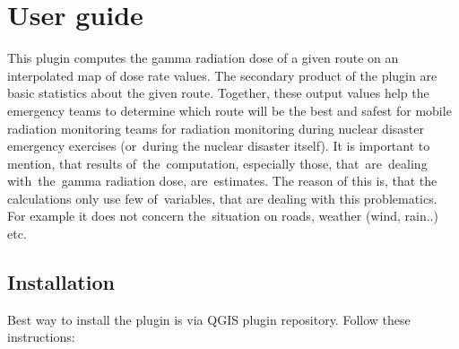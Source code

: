 \chapter{User guide} \label{User guide}

This plugin computes the gamma radiation dose of a given route on an
interpolated map of dose rate values. The secondary product of the
plugin are basic statistics about the given route. Together, these
output values help the emergency teams to determine which route will be
the best and safest for mobile radiation monitoring teams for radiation
monitoring during nuclear disaster emergency exercises (or~during the
nuclear disaster itself). It is important to mention, that results of~the~computation, especially
those, that~are~dealing with~the~gamma radiation dose, are~estimates.
The reason of this is, that the calculations only use few of~variables,
that are dealing with this problematics. For example it does not concern
the~situation on roads, weather (wind, rain..) etc.

\section{Installation}
Best way to install the plugin is via QGIS plugin repository.
Follow these instructions:

